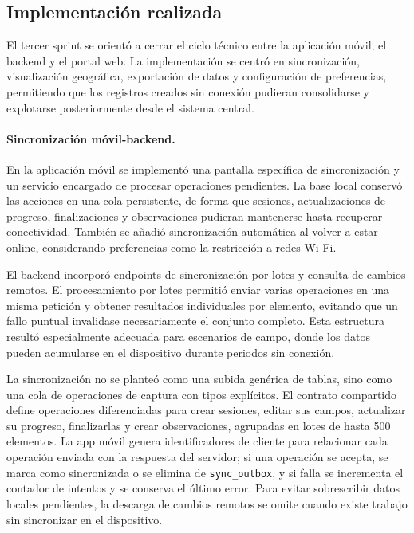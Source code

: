 \subsection{Implementación realizada}

El tercer sprint se orientó a cerrar el ciclo técnico entre la aplicación móvil,
el backend y el portal web. La implementación se centró en sincronización,
visualización geográfica, exportación de datos y configuración de preferencias,
permitiendo que los registros creados sin conexión pudieran consolidarse y
explotarse posteriormente desde el sistema central.

\paragraph{Sincronización móvil-backend.}
En la aplicación móvil se implementó una pantalla específica de sincronización
y un servicio encargado de procesar operaciones pendientes. La base local
conservó las acciones en una cola persistente, de forma que sesiones,
actualizaciones de progreso, finalizaciones y observaciones pudieran mantenerse
hasta recuperar conectividad. También se añadió sincronización automática al
volver a estar online, considerando preferencias como la restricción a redes
Wi-Fi.

El backend incorporó endpoints de sincronización por lotes y consulta de cambios
remotos. El procesamiento por lotes permitió enviar varias operaciones en una
misma petición y obtener resultados individuales por elemento, evitando que un
fallo puntual invalidase necesariamente el conjunto completo. Esta estructura
resultó especialmente adecuada para escenarios de campo, donde los datos pueden
acumularse en el dispositivo durante periodos sin conexión.

La sincronización no se planteó como una subida genérica de tablas, sino como
una cola de operaciones de captura con tipos explícitos. El contrato compartido
define operaciones diferenciadas para crear sesiones, editar sus campos,
actualizar su progreso, finalizarlas y crear observaciones, agrupadas en lotes
de hasta 500 elementos. La app móvil genera identificadores de cliente para
relacionar cada operación enviada con la respuesta del servidor; si una
operación se acepta, se marca como sincronizada o se elimina de
\texttt{sync\_outbox}, y si falla se incrementa el contador de intentos y se
conserva el último error. Para evitar sobrescribir datos locales pendientes, la
descarga de cambios remotos se omite cuando existe trabajo sin sincronizar en
el dispositivo.

